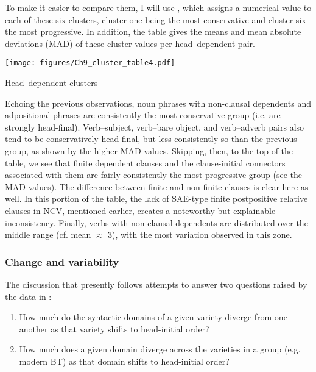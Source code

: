 \documentclass[output=paper,colorlinks,citecolor=brown]{langscibook}
\begin{document}
To make it easier to compare them, I will use , which assigns a numerical value to each of these six clusters, cluster one being the most conservative and cluster six the most progressive. In addition, the table gives the means and mean absolute deviations (MAD) of these cluster values per head--dependent pair. 


\begin{table}[htbp]
  \centering
  \setlength{\abovecaptionskip}{0cm}
  \texttt{[image: figures/Ch9\_cluster\_table4.pdf]}
  \caption{Head--dependent clusters}
  \label{tab:keskin:cluster_table}
\end{table}


Echoing the previous observations, noun phrases with non-clausal dependents and adpositional phrases are consistently the most conservative group (i.e. are strongly head-final). Verb--subject, verb--bare object, and verb--adverb pairs also tend to be conservatively head-final, but less consistently so than the previous group, as shown by the higher MAD values. Skipping, then, to the top of the table, we see that finite dependent clauses and the clause-initial connectors associated with them are fairly consistently the most progressive group (see the MAD values). The difference between finite and non-finite clauses is clear here as well. In this portion of the table, the lack of SAE-type finite postpositive relative clauses in NCV, mentioned earlier, creates a noteworthy but explainable inconsistency. Finally, verbs with non-clausal dependents are distributed over the middle range (cf. mean $≈$ 3), with the most variation observed in this zone.

\subsubsection{Change and variability}
\label{sec:keskin:change_variab}

The discussion that presently follows attempts to answer two questions raised by the data in :

\begin{enumerate}
    \item How much do the syntactic domains of a given variety diverge from one another as that variety shifts to head-initial order?
    \item How much does a given domain diverge across the varieties in a group (e.g. modern BT) as that domain shifts to head-initial order?
\end{enumerate}
\end{document}
